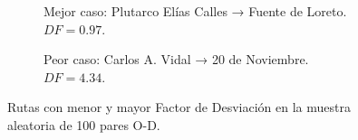 \begin{figure}[H]
    \centering
    \begin{subfigure}[t]{0.48\textwidth}
        \caption{Mejor caso: Plutarco Elías Calles → Fuente de Loreto. $DF = 0.97$.}
        \label{fig:df-mejor-caso}
    \end{subfigure}
    \hfill
    \begin{subfigure}[t]{0.48\textwidth}
        \caption{Peor caso: Carlos A. Vidal → 20 de Noviembre. $DF = 4.34$.}
        \label{fig:df-peor-caso}
    \end{subfigure}
    \caption[Extremos del Factor de Desviación en la muestra aleatoria]{
    Rutas con menor y mayor Factor de Desviación en la muestra aleatoria de 100 pares O-D.}
    \label{fig:df-extremos}
\end{figure}

